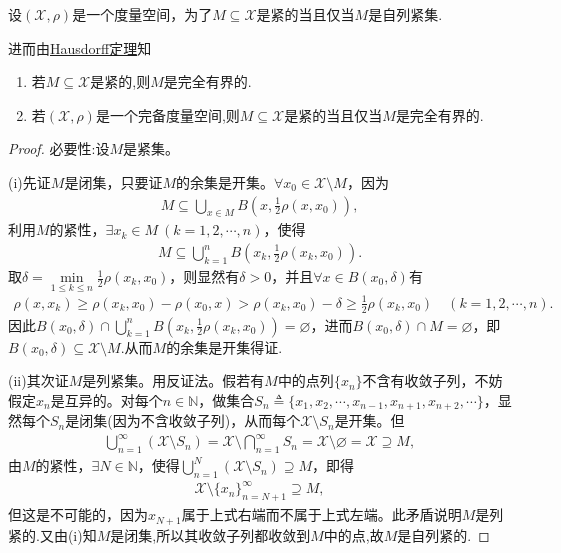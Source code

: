 \documentclass[../../main.tex]{subfiles}%
\begin{document}
\begin{theorem}\label{theorem:紧集等价于自列紧}
设$(\mathscr{X},\rho)$是一个度量空间，为了$M\subseteq\mathscr{X}$是紧的当且仅当$M$是自列紧集.

进而由\hyperref[theorem:泛函分析--Hausdorff定理]{Hausdorff定理}知
\begin{enumerate}[(1)]
\item 若$M\subseteq\mathscr{X}$是紧的,则$M$是完全有界的.

\item 若$(\mathscr{X},\rho)$是一个完备度量空间,则$M\subseteq\mathscr{X}$是紧的当且仅当$M$是完全有界的.
\end{enumerate}
\end{theorem}
\begin{proof}

{\heiti 必要性:}设$M$是紧集。

(i)先证$M$是闭集，只要证$M$的余集是开集。$\forall x_0\in\mathscr{X}\setminus M$，因为
\begin{align*}
M\subseteq\bigcup\limits_{x\in M}B\left(x,\frac{1}{2}\rho(x,x_0)\right),
\end{align*}
利用$M$的紧性，$\exists x_k\in M\ (k=1,2,\cdots,n)$，使得
\begin{align*}
M\subseteq\bigcup\limits_{k=1}^n B\left(x_k,\frac{1}{2}\rho(x_k,x_0)\right).
\end{align*}
取$\delta=\min\limits_{1\leqslant k\leqslant n}\frac{1}{2}\rho(x_k,x_0)$，则显然有$\delta>0$，并且$\forall x\in B(x_0,\delta)$有
\begin{align*}
\rho (x,x_k)\geqslant \rho (x_k,x_0)-\rho (x_0,x)>\rho (x_k,x_0)-\delta \geqslant \frac{1}{2}\rho (x_k,x_0)\quad (k=1,2,\cdots ,n).
\end{align*}
因此$B(x_0,\delta )\cap \bigcup_{k=1}^n{B\left( x_k,\frac{1}{2}\rho (x_k,x_0) \right)}=\varnothing $，进而$B(x_0,\delta)\cap M=\varnothing$，即$B(x_0,\delta)\subseteq \mathscr{X}\setminus M$.从而$M$的余集是开集得证.

(ii)其次证$M$是列紧集。用反证法。假若有$M$中的点列$\{x_n\}$不含有收敛子列，不妨假定$x_n$是互异的。对每个$n\in\mathbb{N}$，做集合$S_n\triangleq\{x_1,x_2,\cdots,x_{n-1},x_{n+1},x_{n+2},\cdots\}$，显然每个$S_n$是闭集(因为不含收敛子列)，从而每个$\mathscr{X}\setminus S_n$是开集。但
\begin{align*}
\bigcup\limits_{n=1}^\infty(\mathscr{X}\setminus S_n)=\mathscr{X}\setminus\bigcap\limits_{n=1}^\infty S_n=\mathscr{X}\setminus\varnothing=\mathscr{X}\supseteq M,
\end{align*}
由$M$的紧性，$\exists N\in\mathbb{N}$，使得$\bigcup\limits_{n=1}^N(\mathscr{X}\setminus S_n)\supseteq M$，即得
\begin{align*}
\mathscr{X}\setminus\{x_n\}_{n=N+1}^\infty\supseteq M,
\end{align*}
但这是不可能的，因为$x_{N+1}$属于上式右端而不属于上式左端。此矛盾说明$M$是列紧的.又由(i)知$M$是闭集,所以其收敛子列都收敛到$M$中的点,故$M$是自列紧的.


\end{proof}
\end{document}
